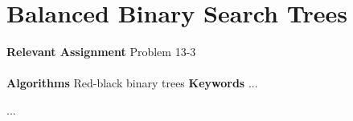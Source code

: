 
\chapter{Balanced Binary Search Trees}
\label{ch:balancedbinarysearchtrees}

\textbf{Relevant Assignment} Problem 13-3\\\\
\textbf{Algorithms} Red-black binary trees
\textbf{Keywords} ...
\vspace{1in}

\noindent ...

